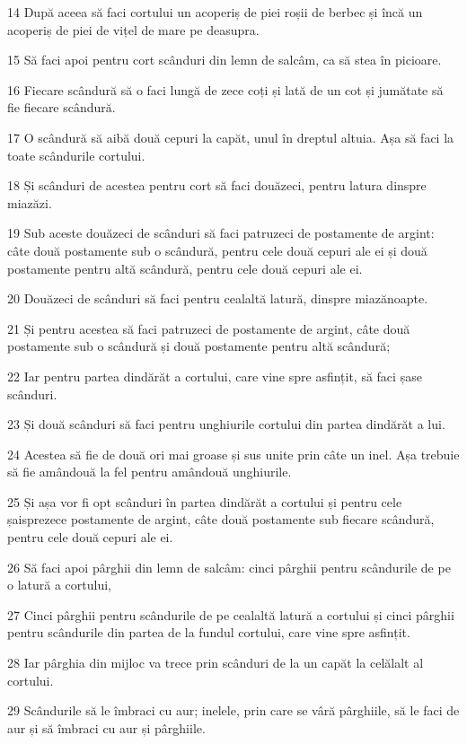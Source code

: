 \par 14 După aceea să faci cortului un acoperiș de piei roșii de berbec și încă un acoperiș de piei de vițel de mare pe deasupra.
\par 15 Să faci apoi pentru cort scânduri din lemn de salcâm, ca să stea în picioare.
\par 16 Fiecare scândură să o faci lungă de zece coți și lată de un cot și jumătate să fie fiecare scândură.
\par 17 O scândură să aibă două cepuri la capăt, unul în dreptul altuia. Așa să faci la toate scândurile cortului.
\par 18 Și scânduri de acestea pentru cort să faci douăzeci, pentru latura dinspre miazăzi.
\par 19 Sub aceste douăzeci de scânduri să faci patruzeci de postamente de argint: câte două postamente sub o scândură, pentru cele două cepuri ale ei și două postamente pentru altă scândură, pentru cele două cepuri ale ei.
\par 20 Douăzeci de scânduri să faci pentru cealaltă latură, dinspre miazănoapte.
\par 21 Și pentru acestea să faci patruzeci de postamente de argint, câte două postamente sub o scândură și două postamente pentru altă scândură;
\par 22 Iar pentru partea dindărăt a cortului, care vine spre asfințit, să faci șase scânduri.
\par 23 Și două scânduri să faci pentru unghiurile cortului din partea dindărăt a lui.
\par 24 Acestea să fie de două ori mai groase și sus unite prin câte un inel. Așa trebuie să fie amândouă la fel pentru amândouă unghiurile.
\par 25 Și așa vor fi opt scânduri în partea dindărăt a cortului și pentru cele șaisprezece postamente de argint, câte două postamente sub fiecare scândură, pentru cele două cepuri ale ei.
\par 26 Să faci apoi pârghii din lemn de salcâm: cinci pârghii pentru scândurile de pe o latură a cortului,
\par 27 Cinci pârghii pentru scândurile de pe cealaltă latură a cortului și cinci pârghii pentru scândurile din partea de la fundul cortului, care vine spre asfințit.
\par 28 Iar pârghia din mijloc va trece prin scânduri de la un capăt la celălalt al cortului.
\par 29 Scândurile să le îmbraci cu aur; inelele, prin care se vâră pârghiile, să le faci de aur și să îmbraci cu aur și pârghiile.
